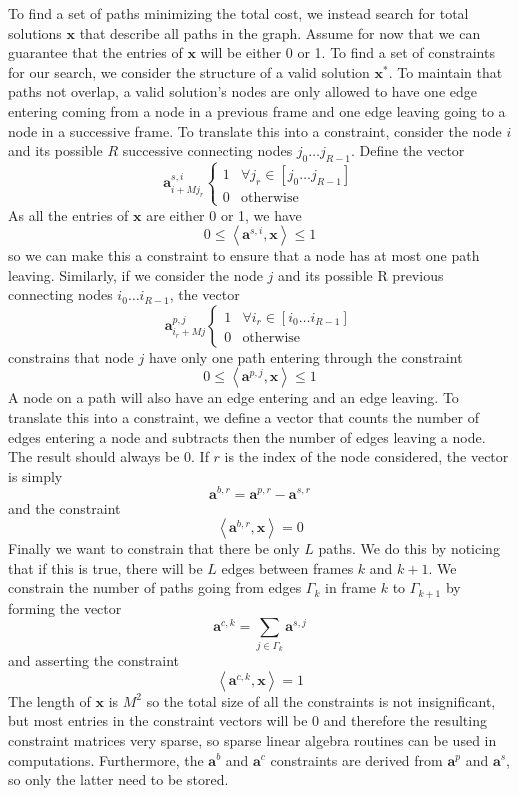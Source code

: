 \documentclass[letterpaper,12pt]{report}
\begin{document}
To find a set of paths minimizing the total cost, we instead search for total
solutions $\boldsymbol{x}$ that describe all paths in the graph. Assume for now
that we can guarantee that the entries of $\boldsymbol{x}$ will be either 0 or
1. To find a set of constraints for our search, we consider the structure of a
valid solution $\boldsymbol{x}^{\ast}$. To maintain that paths not overlap, a
valid solution's nodes are only allowed to have one edge entering \textemdash
coming from a node in a previous frame \textemdash and one edge leaving
\textemdash going to a node in a successive frame. To translate this into a
constraint, consider the node $i$ and its possible $R$ successive connecting
nodes $j_{0} \dotsc j_{R-1}$. Define the vector
\[
    \boldsymbol{a}^{s,i}_{i + Mj_{r}} \begin{cases}
        1 & \forall j_{r} \in \left[ j_{0} \dotsc j_{R-1} \right] \\
        0 & \text{otherwise}
    \end{cases}
\]
As all the entries of $\boldsymbol{x}$ are either 0 or 1, we have
\[
    0 \leq \left\langle \boldsymbol{a}^{s,i}, \boldsymbol{x} \right\rangle \leq 1
\]
so we can make this a constraint to ensure that a node has at most one path
leaving. Similarly, if we consider the node $j$ and its possible R previous connecting
nodes $i_{0} \dotsc i_{R-1}$, the vector
\[
    \boldsymbol{a}^{p,j}_{i_{r} + Mj} \begin{cases}
        1 & \forall i_{r} \in \left[ i_{0} \dotsc i_{R-1} \right] \\
        0 & \text{otherwise}
    \end{cases}
\]
constrains that node $j$ have only one path entering through the constraint
\[
    0 \leq \left\langle \boldsymbol{a}^{p,j} , \boldsymbol{x} \right\rangle \leq 1
\]
A node on a path will also have an edge entering and an edge leaving. To
translate this into a constraint, we define a vector that counts the number of
edges entering a node and subtracts then the number of edges leaving a node. The
result should always be 0. If $r$ is the index of the node considered, the vector is simply
\[
    \boldsymbol{a}^{b,r} = \boldsymbol{a}^{p,r} - \boldsymbol{a}^{s,r}
\]
and the constraint
\[
    \left\langle \boldsymbol{a}^{b,r}, \boldsymbol{x} \right\rangle = 0
\]
Finally we want to constrain that there be only $L$ paths. We do this by
noticing that if this is true, there will be $L$ edges between frames $k$ and
$k+1$. We constrain the number of paths going from edges
$\Gamma_{k}$ in frame $k$ to $\Gamma_{k+1}$ by forming the vector
\[
    \boldsymbol{a}^{c,k} = \sum_{j \in \Gamma_{k}} \boldsymbol{a}^{s,j}
\]
and asserting the constraint
\[
    \left\langle \boldsymbol{a}^{c,k} , \boldsymbol{x} \right\rangle = 1
\]
The length of $\boldsymbol{x}$ is $M^{2}$ so the total size of all the
constraints is not insignificant, but most entries in the constraint vectors will
be 0 and therefore the resulting constraint matrices very sparse, so sparse
linear algebra routines can be used in computations. Furthermore, the
$\boldsymbol{a}^{b}$ and $\boldsymbol{a}^{c}$ constraints are derived from
$\boldsymbol{a}^{p}$ and $\boldsymbol{a}^{s}$, so only the latter need to be
stored.
\end{document}
